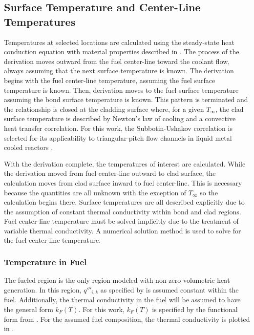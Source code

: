   \subsection{Surface Temperature and Center-Line Temperatures}
    \label{sec:surface_temps}
    Temperatures at selected locations are calculated using the steady-state
    heat conduction equation with material properties described in
    . The process of the derivation moves outward
    from the fuel center-line toward the coolant flow, always assuming that the
    next surface temperature is known. The derivation begins with the fuel 
    center-line temperature, assuming the fuel surface temperature is known. 
    Then, derivation moves to the fuel surface temperature assuming the bond 
    surface temperature is known. This pattern is terminated and the 
    relationship is closed at the cladding surface where, for a given 
    $T_{\infty}$, the clad surface temperature is described by Newton's law of 
    cooling and a convective heat transfer correlation. For this work, the 
    Subbotin-Ushakov correlation is selected for its applicability to 
    triangular-pitch flow channels in liquid metal cooled reactors 
    \cite{subbotinUshakov}.

    With the derivation complete, the temperatures of interest are calculated.
    While the derivation moved from fuel center-line outward to clad surface,
    the calculation moves from clad surface inward to fuel center-line. This is
    necessary because the quantities are all unknown with the exception of
    $T_{\infty}$ so the calculation begins there. Surface temperatures are all
    described explicitly due to the assumption of constant thermal conductivity
    within bond and clad regions. Fuel center-line temperature must be solved
    implicitly due to the treatment of variable thermal conductivity. A
    numerical solution method is used to solve for the fuel center-line
    temperature.
    
    \subsubsection{Temperature in Fuel}
      The fueled region is the only region modeled with non-zero volumetric heat
      generation. In this region, $q'''_{i,k}$ as specified by 
       is assumed constant within the fuel. 
      Additionally, the thermal conductivity in the fuel will be assumed to have
      the general form $k_F(T)$. For this work, $k_F(T)$ is specified by the
      functional form from \cite{fuelProp}. For the assumed fuel composition, 
      the thermal conductivity is plotted in .

